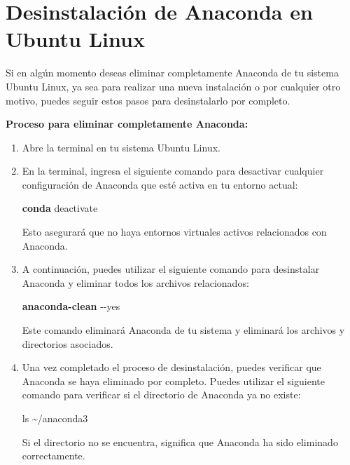 \documentclass[
  letterpaper,
  DIV=11,
  numbers=noendperiod]{scrartcl}
\newenvironment{Shaded}{}{}
\newcommand{\AttributeTok}[1]{\textcolor[rgb]{0.84,0.23,0.29}{#1}}
\newcommand{\ExtensionTok}[1]{\textcolor[rgb]{0.84,0.23,0.29}{\textbf{#1}}}
\newcommand{\FunctionTok}[1]{\textcolor[rgb]{0.44,0.26,0.76}{#1}}
\newcommand{\NormalTok}[1]{\textcolor[rgb]{0.14,0.16,0.18}{#1}}
\begin{document}
\hypertarget{desinstalaciuxf3n-de-anaconda-en-ubuntu-linux}{%
\section{Desinstalación de Anaconda en Ubuntu
Linux}\label{desinstalaciuxf3n-de-anaconda-en-ubuntu-linux}}

Si en algún momento deseas eliminar completamente Anaconda de tu sistema
Ubuntu Linux, ya sea para realizar una nueva instalación o por cualquier
otro motivo, puedes seguir estos pasos para desinstalarlo por completo.

\textbf{Proceso para eliminar completamente Anaconda:}

\begin{enumerate}
\def\labelenumi{\arabic{enumi}.}
\item
  Abre la terminal en tu sistema Ubuntu Linux.
\item
  En la terminal, ingresa el siguiente comando para desactivar cualquier
  configuración de Anaconda que esté activa en tu entorno actual:

\begin{Shaded}
\begin{Highlighting}[]
\ExtensionTok{conda}\NormalTok{ deactivate}
\end{Highlighting}
\end{Shaded}

  Esto asegurará que no haya entornos virtuales activos relacionados con
  Anaconda.
\item
  A continuación, puedes utilizar el siguiente comando para desinstalar
  Anaconda y eliminar todos los archivos relacionados:

\begin{Shaded}
\begin{Highlighting}[]
\ExtensionTok{anaconda{-}clean} \AttributeTok{{-}{-}yes}
\end{Highlighting}
\end{Shaded}

  Este comando eliminará Anaconda de tu sistema y eliminará los archivos
  y directorios asociados.
\item
  Una vez completado el proceso de desinstalación, puedes verificar que
  Anaconda se haya eliminado por completo. Puedes utilizar el siguiente
  comando para verificar si el directorio de Anaconda ya no existe:

\begin{Shaded}
\begin{Highlighting}[]
\FunctionTok{ls}\NormalTok{ \textasciitilde{}/anaconda3}
\end{Highlighting}
\end{Shaded}

  Si el directorio no se encuentra, significa que Anaconda ha sido
  eliminado correctamente.
\end{enumerate}
\end{document}

